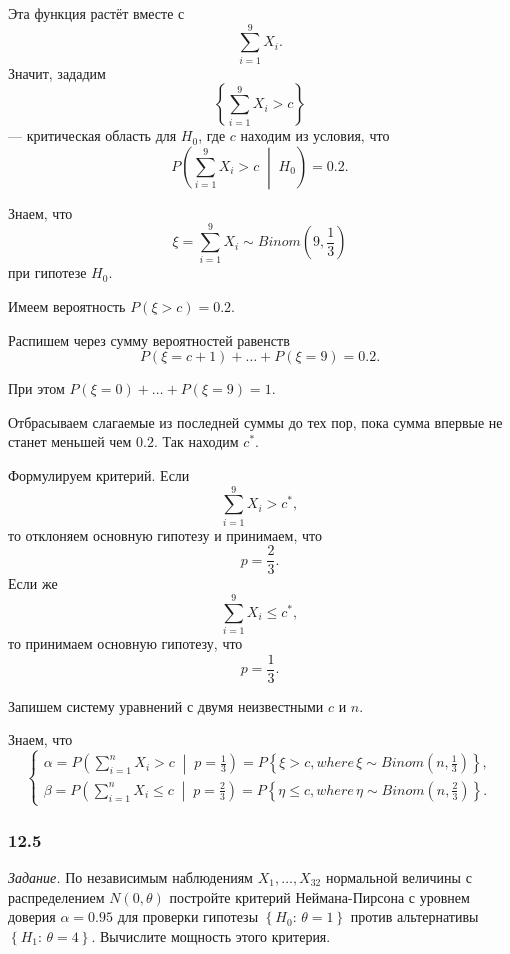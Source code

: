 Эта функция растёт вместе с
$$ \sum \limits_{i = 1}^9 X_i.$$
Значит, зададим
$$ \left\{ \sum \limits_{i = 1}^9 X_i > c \right\} $$
--- критическая область для $H_0$, где $c$ находим из условия, что
$$P \left( \sum \limits_{i = 1}^9 X_i > c \; \middle| \; H_0 \right) =
  0.2.$$

Знаем, что
$$ \xi =
  \sum \limits_{i = 1}^9 X_i \sim
  Binom \left( 9, \frac{1}{3} \right) $$
при гипотезе $H_0$.

Имеем вероятность $P \left( \xi > c \right) = 0.2$.

Распишем через сумму вероятностей равенств
$$P \left( \xi = c + 1 \right) + \dotsc + P \left( \xi = 9 \right) =
  0.2.$$

При этом $P \left( \xi = 0 \right) + \dotsc + P \left( \xi = 9 \right) = 1$.

Отбрасываем слагаемые из последней суммы до тех пор, пока сумма впервые не станет меньшей чем $0.2$.
Так находим $c^*$.

Формулируем критерий.
Если
$$ \sum \limits_{i = 1}^9 X_i >
  c^*,$$
то отклоняем основную гипотезу и принимаем, что
$$p =
  \frac{2}{3}.$$
Если же
$$ \sum \limits_{i = 1}^9 X_i \leq
  c^*,$$
то принимаем основную гипотезу, что
$$p =
  \frac{1}{3}.$$

Запишем систему уравнений с двумя неизвестными $c$ и $n$.

Знаем, что
$$ \begin{cases}
    \alpha =
      P \left( \sum \limits_{i = 1}^n X_i > c \; \middle| \; p = \frac{1}{3} \right) =
      P \left\{ \xi > c, where \, \xi \sim Binom \left( n, \frac{1}{3} \right) \right\}, \\
    \beta =
      P \left( \sum \limits_{i = 1}^n X_i \leq c \; \middle| \; p = \frac{2}{3} \right) =
      P \left\{ \eta \leq c, where \, \eta \sim Binom \left( n, \frac{2}{3} \right) \right\}.
  \end{cases}$$

\subsubsection*{12.5}

\textit{Задание.}
По независимым наблюдениям $X_1, \dotsc, X_{32}$ нормальной величины с распределением
$N \left( 0, \theta \right) $ постройте критерий Неймана-Пирсона с уровнем доверия $ \alpha = 0.95$
для проверки гипотезы $ \left\{ H_0: \, \theta = 1 \right\} $ против альтернативы
$ \left\{ H_1: \, \theta = 4 \right\} $.
Вычислите мощность этого критерия.

